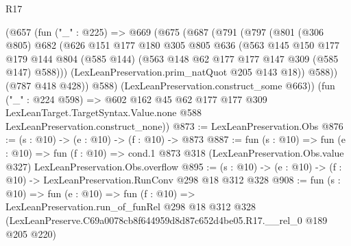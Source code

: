 \begin{lexlean}{R17}
\begin{coremodule}
    (@657
      (fun ("_" : @225) =>
      @669
        (@675
          (@687
            (@791
              (@797
                (@801
                  (@306 @805)
                  @682
                  (@626
                    @151
                    @177
                    @180
                    @305
                    @805
                    @636
                    (@563
                      @145
                      @150
                      @177
                      @179
                      @144
                      @804
                      (@585 @144)
                      (@563 @148 @62 @177 @177 @147 @309 (@585 @147) @588)))
                  (LexLeanPreservation.prim_natQuot @205 @143 @18))
                @588))
            (@787 @418 @428))
          @588)
        (LexLeanPreservation.construct_some @663))
      (fun ("_" : @224 @598) =>
      @602
        @162
        @45
        @62
        @177
        @177
        @309
        LexLeanTarget.TargetSyntax.Value.none
        @588
        LexLeanPreservation.construct_none))
@873 := LexLeanPreservation.Obs
@876 := (s : @10) -> (e : @10) -> (f : @10) -> @873
@887 := fun (s : @10) =>
  fun (e : @10) =>
  fun (f : @10) =>
  cond.{1} @873 @318 (LexLeanPreservation.Obs.value @327) LexLeanPreservation.Obs.overflow
@895 := (s : @10) -> (e : @10) -> (f : @10) -> LexLeanPreservation.RunConv @298 @18 @312 @328
@908 := fun (s : @10) =>
  fun (e : @10) =>
  fun (f : @10) =>
  LexLeanPreservation.run_of_funRel
    @298
    @18
    @312
    @328
    (LexLeanPreserve.C69a0078cb8f644959d8d87c652d4be05.R17.__rel_0 @189 @205 @220)
\end{coremodule}
\end{lexlean}
